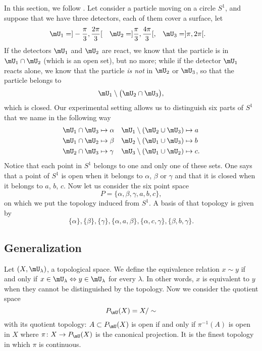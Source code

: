 In this section, we follow \cite{Landi}. Let consider a particle moving on a circle $S^1$, and suppose that we have three detectors, each of them cover a surface, let
\begin{align*}
	\mU_1 & =]-\frac{ \pi }{ 3 },\frac{ 2\pi }{ 3 }[ & \mU_2 & =]\frac{ \pi }{ 3 },\frac{ 4\pi }{ 3 }[, & \mU_3 & =]\pi,2\pi[.
\end{align*}
If the detectors $\mU_1$ and $\mU_2$ are react, we know that the particle is in $\mU_1\cap\mU_2$ (which is an open set), but no more; while if the detector $\mU_1$ reacts alone, we know that the particle \emph{is not} in $\mU_2$ or $\mU_3$, so that the particle belongs to
\[
	\mU_1\setminus\big( \mU_2\cap\mU_3 \big),
\]
which is closed. Our experimental setting allows us to distinguish six parts of $S^1$ that we name in the following way
\begin{align*}
	\mU_1\cap\mU_3 & \mapsto \alpha & \mU_1\setminus (\mU_2\cup\mU_3) & \mapsto a  \\
	\mU_1\cap\mU_2 & \mapsto \beta  & \mU_2\setminus (\mU_1\cup\mU_3) & \mapsto b  \\
	\mU_2\cap\mU_3 & \mapsto \gamma & \mU_3\setminus (\mU_1\cup\mU_2) & \mapsto c.
\end{align*}
Notice that each point in $S^1$ belongs to one and only one of these sets. One says that a point of $S^1$ is open when it belongs to $\alpha$, $\beta$ or $\gamma$ and that it is closed when it belongs to $a$, $b$, $c$. Now let us consider the six point space
\[
	P=\{ \alpha,\beta,\gamma,a,b,c \},
\]
on which we put the topology induced from $S^1$. A basis of that topology is given by
\[
	\{ \alpha \},\{ \beta \},\{ \gamma \},\{ \alpha,a,\beta \},\{ \alpha,c,\gamma \},\{ \beta,b,\gamma \}.
\]

\subsection{Generalization}

Let $(X,\mU_{\lambda})$, a topological space. We define the equivalence relation $x\sim y$ if and only if $x\in\mU_{\lambda}\Leftrightarrow y\in\mU_{\lambda}$ for every $\lambda$. In other words, $x$ is equivalent to $y$ when they cannot be distinguished by the topology. Now we consider the quotient space
\[
	P_{\mU}(X)=X/\sim
\]
with its quotient topology: $A\subset P_{\mU}(X)$ is open if and only if $\pi^{-1}(A)$ is open in $X$ where $\pi\colon X\to P_{\mU}(X)$ is the canonical projection. It is the finest topology in which $\pi$ is continuous.

